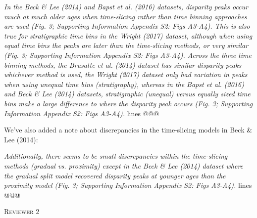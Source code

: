 \documentclass[12pt,letterpaper]{article}
\renewcommand{\section}[1]{%
\bigskip
\begin{center}
\begin{Large}
\normalfont\scshape #1
\medskip
\end{Large}
\end{center}}
\begin{document}
\begin{enumerate}
\textit{In the Beck \& Lee (2014) and Bapst et al. (2016) datasets, disparity peaks occur much at much older ages when time-slicing rather than time binning approaches are used (Fig. 3; Supporting Information Appendix S2: Figs A3-A4).
This is also true for stratigraphic time bins in the Wright (2017) dataset, although when using equal time bins the peaks are later than the time-slicing methods, or very similar (Fig. 3; Supporting Information Appendix S2: Figs A3-A4).
Across the three time binning methods, the Brusatte et al. (2014) dataset has similar disparity peaks whichever method is used, the Wright (2017) dataset only had variation in peaks when using unequal time bins (stratigraphy), whereas in the Bapst et al. (2016) and Beck \& Lee (2014) datasets, stratigraphic (unequal) versus equally sized time bins make a large difference to where the disparity peak occurs (Fig. 3; Supporting Information Appendix S2: Figs A3-A4).} lines @@@

We've also added a note about discrepancies in the time-slicing models in Beck \& Lee (2014): 

\textit{Additionally, there seems to be small discrepancies within the time-slicing methods (gradual vs. proximity) except in the Beck \& Lee (2014) dataset where the gradual split model recovered disparity peaks at younger ages than the proximity model (Fig. 3; Supporting Information Appendix S2: Figs A3-A4).} lines @@@

\end{enumerate}

%
%

\section{Reviewer 2}
\end{document}
